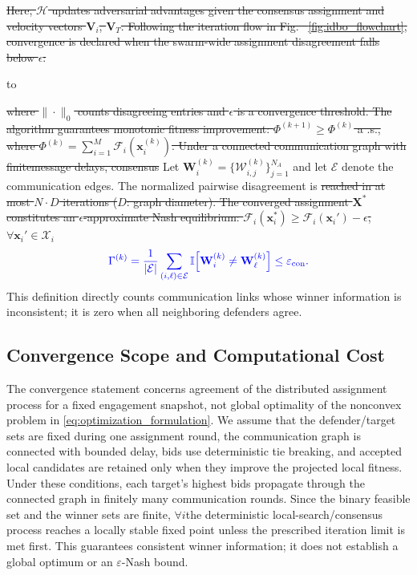 \documentclass[lettersize,journal]{IEEEtran}
\providecommand{\DIFadd}[1]{{\protect\color{blue}#1}} %
\providecommand{\DIFdel}[1]{{\protect\color{red}\sout{#1}}}                      %
\newcommand{\DIFdelDISPLAY}[1]{%
  \par\addvspace{4pt}%
  \sbox{\DIFDELbox}{$\displaystyle\color{red}\begin{aligned}#1\end{aligned}$}%
  \noindent\hbox to\hsize{\hfil %
    \rlap{\usebox{\DIFDELbox}}%
    \raisebox{\dimexpr(\ht\DIFDELbox-\dp\DIFDELbox)/2\relax}[0pt][0pt]{\textcolor{red}{\rule{\wd\DIFDELbox}{0.6pt}}}%
    \hfil}%
  \par\addvspace{4pt}%
} %
\providecommand{\DIFaddbegin}{} %
\providecommand{\DIFaddend}{} %
\providecommand{\DIFdelbegin}{} %
\providecommand{\DIFdelend}{} %
\newcommand{\DIFscaledelfig}{0.5}
\newlength{\DIFdelgraphicswidth} %
\newlength{\DIFdelgraphicsheight} %
\newcommand{\DIFaddincludegraphics}[2][]{{\color{blue}\fbox{\DIFOincludegraphics[#1]{#2}}}} %
\newcommand{\DIFdelincludegraphics}[2][]{%
\sbox{\DIFdelgraphicsbox}{\DIFOincludegraphics[#1]{#2}}%
\settoboxwidth{\DIFdelgraphicswidth}{\DIFdelgraphicsbox} %
\settoboxtotalheight{\DIFdelgraphicsheight}{\DIFdelgraphicsbox} %
\scalebox{\DIFscaledelfig}{%
\parbox[b]{\DIFdelgraphicswidth}{\usebox{\DIFdelgraphicsbox}\\[-\baselineskip] \rule{\DIFdelgraphicswidth}{0em}}\llap{\resizebox{\DIFdelgraphicswidth}{\DIFdelgraphicsheight}{%
\setlength{\unitlength}{\DIFdelgraphicswidth}%
\begin{picture}(1,1)%
\thicklines\linethickness{2pt} %
{\color[rgb]{1,0,0}\put(0,0){\framebox(1,1){}}}%
{\color[rgb]{1,0,0}\put(0,0){\line( 1,1){1}}}%
{\color[rgb]{1,0,0}\put(0,1){\line(1,-1){1}}}%
\end{picture}%
}\hspace*{3pt}}} %
} %
\DeclareRobustCommand{\DIFaddbegin}{\DIFOaddbegin \let\includegraphics\DIFaddincludegraphics} %
\DeclareRobustCommand{\DIFaddend}{\DIFOaddend \let\includegraphics\DIFOincludegraphics} %
\DeclareRobustCommand{\DIFdelbegin}{\DIFOdelbegin \let\includegraphics\DIFdelincludegraphics} %
\DeclareRobustCommand{\DIFdelend}{\DIFOaddend \let\includegraphics\DIFOincludegraphics} %
\begin{document}
\DIFdelbegin \DIFdel{Here, $\mathcal{H}$ updates adversarial advantages given the consensus assignment and velocity vectors $\mathbf{V}_i$, $\mathbf{V}_T$. Following the iteration flow in Fig. ~\ref{fig:idbo_flowchart}, convergence is declared when the swarm-wide assignment disagreement falls below $\epsilon$:
}%

\DIFdelDISPLAY{%
\Gamma^{(k)} = \frac{1}{M} \sum_{i=1}^{M} \left\| \mathbf{z}_i^{(k)} - \frac{1}{|\mathcal{N}_i|} \sum_{j \in \mathcal{N}_i} \mathbf{z}_j^{(k)} \right\|_0 < \epsilon
}
\DIFdel{where $\|\cdot\|_0$ counts disagreeing entries and $\epsilon$ is a convergence threshold.
The algorithm guarantees monotonic fitness improvement: $\Phi^{(k+1)} \geq \Phi^{(k)}$ a
.s., where $\Phi^{(k)} = \sum_{i=1}^{M} \mathcal{F}_i(\mathbf{x}_i^{(k)})$. Under a connected communication graph with finitemessage delays, consensus }\DIFdelend \DIFaddbegin \DIFadd{Let $\mathbf W_i^{(k)}=\{\mathcal W_{i,j}^{(k)}\}_{j=1}^{N_A}$ and let
$\mathcal E$ denote the communication edges. The normalized pairwise disagreement }\DIFaddend is
\DIFdelbegin \DIFdel{reached in at most $N \cdot D$ iterations ($D$: graph diameter). The converged assignment $\mathbf{X}^*$ constitutes an
$\epsilon$-approximate Nash equilibrium: $\mathcal{F}_i(\mathbf{x}_i^*) \geq \mathcal{F}_i(\mathbf{x}_i') - \epsilon$, $\forall \mathbf{x}_i' \in \mathcal{X}_i$}\DIFdelend \DIFaddbegin \begin{equation}
\DIFadd{\label{eq:convergence}
\Gamma^{(k)}=\frac{1}{|\mathcal E|}
\sum_{(i,\ell)\in\mathcal E}
\mathbb I\!\left[\mathbf W_i^{(k)}\neq\mathbf W_{\ell}^{(k)}\right]
\leq\varepsilon_{\mathrm{con}}.
}\end{equation}
\DIFadd{This definition directly counts communication links whose winner information is inconsistent;
it is zero when all neighboring defenders agree.
}

\subsection{\DIFadd{Convergence Scope and Computational Cost}}
\label{subsec:convergence_equilibrium}

\DIFadd{The convergence statement concerns agreement of the distributed assignment process for a
fixed engagement snapshot, not global optimality of the nonconvex problem in
}\eqref{eq:optimization_formulation}\DIFadd{. We assume that the defender/target sets are fixed during
one assignment round, the communication graph is connected with bounded delay, bids use
deterministic tie breaking, and accepted local candidates are retained only when they improve
the projected local fitness. Under these conditions, each target's highest bids propagate
through the connected graph in finitely many communication rounds. Since the binary feasible
set and the winner sets are finite}\DIFaddend , \DIFdelbegin \DIFdel{$\forall i$}\DIFdelend \DIFaddbegin \DIFadd{the deterministic local-search/consensus process reaches a
locally stable fixed point unless the prescribed iteration limit is met first. This guarantees
consistent winner information; it does not establish a global optimum or an
$\varepsilon$-Nash bound}\DIFaddend .
\end{document}

